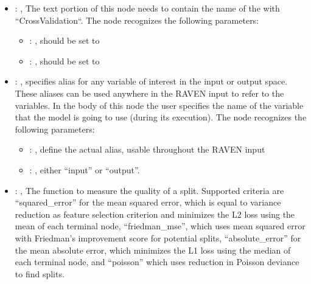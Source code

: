 \begin{itemize}
\begin{itemize}
        \item {}: ,
          List of IDs of features/variables to include in the transformation process.

        \item {}: ,
          Which space to search? Target or Feature?
      \end{itemize}

    \item {}: ,
      The text portion of this node needs to contain the name of the  with
               ``CrossValidation``.
      The  node recognizes the following parameters:
        \begin{itemize}
          \item {}: ,
            should be set to 
          \item {}: ,
            should be set to 
      \end{itemize}

    \item {}: ,
      specifies alias for         any variable of interest in the input or output space. These
      aliases can be used anywhere in the RAVEN input to         refer to the variables. In the body
      of this node the user specifies the name of the variable that the model is going to use
      (during its execution).
      The  node recognizes the following parameters:
        \begin{itemize}
          \item {}: ,
            define the actual alias, usable throughout the RAVEN input
          \item {}: ,
            either ``input'' or ``output''.
      \end{itemize}

    \item {}: ,
      The function to measure the quality of a split. Supported criteria are ``squared\_error'' for
      the mean squared error,                                                  which is equal to
      variance reduction as feature selection criterion and minimizes the L2 loss using the mean of
      each                                                  terminal node, ``friedman\_mse'', which
      uses mean squared error with Friedman's improvement score for potential splits,
      ``absolute\_error'' for the mean absolute error, which minimizes the L1 loss using the median
      of each terminal node, and ``poisson''                                                  which
      uses reduction in Poisson deviance to find splits.


\end{itemize}
